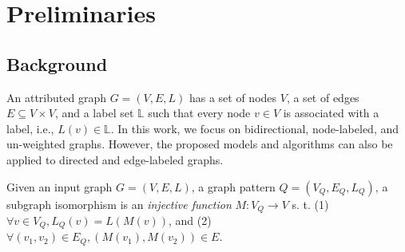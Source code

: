 \section{Preliminaries}
\label{sec:preliminaries}

\subsection{Background}
\label{sec:background}

An attributed graph $G = (V,E,L)$ has a set of nodes $V$, a set of edges
$E \subseteq V \times V$, and a label set $\mathbb{L}$ such that
every node $v \in V$ is associated with a label, i.e., $L(v) \in \mathbb{L}$.
In this work, we focus on bidirectional, node-labeled, and un-weighted
graphs. However, the proposed models and algorithms can also be applied to directed
and edge-labeled graphs.

 Given an input graph $G=(V,E,L)$, a graph pattern
$Q=(V_Q,E_Q,L_Q)$, a subgraph isomorphism is an {\em injective function} $M: V_Q \rightarrow V$ s. t.
(1) $\forall v\in V_Q, L_Q(v)= L(M(v))$, and (2) $\forall(v_1,v_2) \in E_Q, (M(v_1),M(v_2))\in E$.

